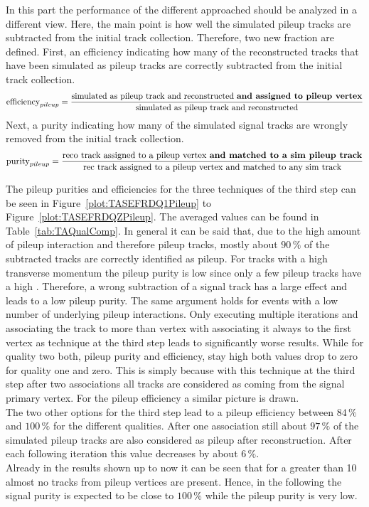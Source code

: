 In this part the performance of the different approached should be analyzed in a different view. Here, the main point is how well the simulated pileup tracks are subtracted from the initial track collection. Therefore, two new fraction are defined. First, an efficiency indicating how many of the reconstructed tracks that have been simulated as pileup tracks are correctly subtracted from the initial track collection. 
\begin{equation}
\textrm{efficiency}_{pileup} = \frac{\textrm{simulated as pileup track and reconstructed \textbf{and assigned to pileup vertex}}}{\textrm{simulated as pileup track and reconstructed}}
\label{eq:PUEfficiency}
\end{equation}
Next, a purity indicating how many of the simulated signal tracks are wrongly removed from the initial track collection.
\begin{equation}
\textrm{purity}_{pileup} = \frac{\textrm{reco track assigned to a pileup vertex \textbf{and matched to a sim pileup track}}}{\textrm{rec track assigned to a pileup vertex and matched to any sim track}}
\label{eq:PUPurity}
\end{equation}

The pileup purities and efficiencies for the three techniques of the third step can be seen in Figure~\ref{plot:TASEFRDQ1Pileup} to Figure~\ref{plot:TASEFRDQZPileup}. The averaged values can be found in Table~\ref{tab:TAQualComp}. In general it can be said that, due to the high amount of pileup interaction and therefore pileup tracks, mostly about $90\,\%$ of the subtracted tracks are correctly identified as pileup. For tracks with a high transverse momentum the pileup purity is low since only a few pileup tracks have a high \pt. Therefore, a wrong subtraction of a signal track has a large effect and leads to a low pileup purity. The same argument holds for events with a low number of underlying pileup interactions. Only executing multiple iterations and associating the track to more than vertex with associating it always to the first vertex as technique at the third step leads to significantly worse results. While for quality two both, pileup purity and efficiency, stay high both values drop to zero for quality one and zero. This is simply because with this technique at the third step after two associations all tracks are considered as coming from the signal primary vertex. For the pileup efficiency a similar picture is drawn. \\
The two other options for the third step lead to a pileup efficiency between $84\,\%$ and $100\,\%$ for the different qualities. After one association still about $97\,\%$ of the simulated pileup tracks are also considered as pileup after reconstruction. After each following iteration this value decreases by about $6\,\%$. \\
Already in the results shown up to now it can be seen that for a \pt{} greater than 10\GeV{} almost no tracks from pileup vertices are present. Hence, in the following the signal purity is expected to be close to $100\,\%$ while the pileup purity is very low.

